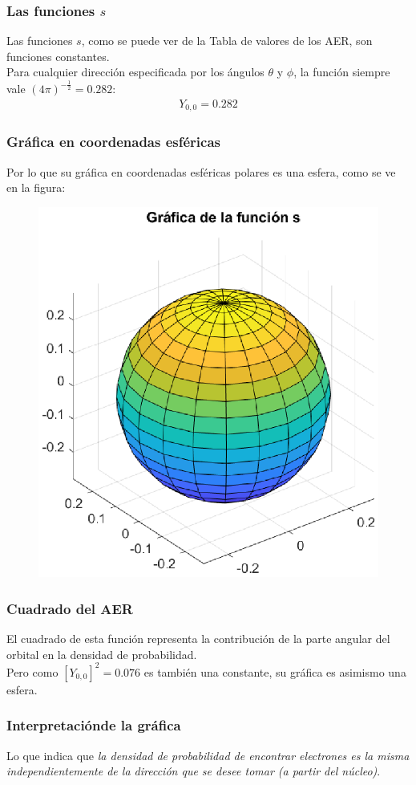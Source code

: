 \documentclass[12pt]{beamer}
\begin{document}
\begin{frame}
\frametitle{Las funciones $s$}
Las funciones $s$, como se puede ver de la Tabla de valores de los AER, son funciones constantes. 
\\
\bigskip
\pause
Para cualquier dirección especificada por los ángulos $\theta$ y $\phi$, la función siempre vale $(4 \pi)^{-\frac{1}{2}} = 0.282$:
\pause
\begin{align*}
Y_{0, 0} = 0.282
\end{align*}
\end{frame}
\begin{frame}
\frametitle{Gráfica en coordenadas esféricas}
Por lo que su gráfica en coordenadas esféricas polares es una esfera, como se ve en la figura:
\pause
\begin{figure}[H]
    \centering
    \includegraphics[scale=0.5]{Imagenes/Plot_Y00_Esfera.eps}
\end{figure}
\end{frame}
\begin{frame}
\frametitle{Cuadrado del AER}
El cuadrado de esta función representa la contribución de la parte angular del orbital en la 
densidad de probabilidad.
\\
\bigskip
\pause
Pero como $[Y_{0,0}]^{2} = 0.076$ es también una constante, su gráfica es asimismo una esfera.
\end{frame}
\begin{frame}
\frametitle{Interpretaciónde la gráfica}
Lo que indica que \emph{la densidad de probabilidad de encontrar electrones es la misma independientemente de la dirección que se desee tomar (a partir del núcleo)}.
\end{frame}
\end{document}
